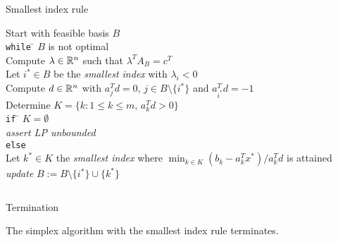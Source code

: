 \begin{frame}{Smallest index rule}

 \begin{tabbing}
      Start with feasible basis $B$ \\[1ex]
      {\tt while} \= $B$ is not optimal \\ [.7ex]
      \> Compute $\lambda \in \mathbb{R}^n$ such that $\lambda^TA_B = c^T$ \\
      \> Let $i^* \in B$ be the \emph{ smallest index} with $\lambda_i<0$ \\
      \> Compute  $d \in \mathbb{R}^n$ with $a_j^T d = 0, \, j \in B \setminus\{i^*\}$
      and $a_{i^*}^T d = -1$ \\ 
      \> Determine $K = \{ k \colon 1 \leq k \leq m, \, a_k^Td >0\}$\\[.7ex]  
      \> {\tt if} \= $K = \emptyset$ \\   
      \> \> \emph{assert LP unbounded} \\
      \> {\tt else} \\
      \> \> Let $k^* \in K$ the \emph{smallest index} where 
     $
        \displaystyle \min_{k \in K} (b_k - a_k^Tx^*)/a_k^Td
      $
      is attained \\ %

      \> \>\emph{update} $B := B \setminus\{i^*\} \cup \{k^*\}$             
    \end{tabbing}
    

  
  \begin{columns}
    \begin{column}{.5\textwidth}
      
    \end{column}
    \begin{column}{.5\textwidth}
      
    \end{column}       
  \end{columns}
\end{frame}




\begin{frame}{Termination}



  \begin{theorem}
    \label{thr:3}
    The simplex algorithm with the smallest index rule terminates. 
  \end{theorem}

  
  \begin{columns}
    \begin{column}{.5\textwidth}
      
    \end{column}
    \begin{column}{.5\textwidth}
      
    \end{column}       
  \end{columns}
\end{frame}



